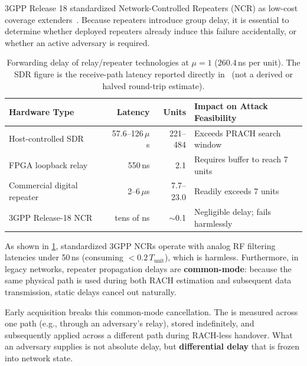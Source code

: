 3GPP Release 18 standardized Network-Controlled Repeaters (NCR) as low-cost coverage
extenders~\cite{3gpp38867,carvalho2024ncr}.
Because repeaters introduce group delay, it is essential to determine whether deployed repeaters already
induce this failure accidentally, or whether an active adversary is required.

\begin{table}[htbp]
  \centering
  \caption{Forwarding delay of relay/repeater technologies at $\mu=1$ ($260.4$\,ns per \TA{} unit). The
  SDR figure is the receive-path latency reported directly in~\cite{usrplatency} (not a derived or
  halved round-trip estimate).}
  \label{tab:hardware}
  \small
  \begin{tabularx}{\textwidth}{@{}l r r X@{}}
    \toprule
    Hardware Type & Latency & \TA{} Units & Impact on Attack Feasibility \\
    \midrule
    Host-controlled SDR~\cite{usrplatency} & 57.6--126\,$\mu$s & 221--484 & Exceeds PRACH search window \\
    FPGA loopback relay~\cite{nifpgaloopback} & 550\,ns & 2.1 & Requires buffer to reach 7 units \\
    Commercial digital repeater~\cite{ti2018repeater} & 2--6\,$\mu$s & 7.7--23.0 & Readily exceeds 7 units \\
    3GPP Release-18 NCR~\cite{3gpp38867,carvalho2024ncr} & tens of ns & $\sim$0.1 & Negligible delay; fails harmlessly \\
    \bottomrule
  \end{tabularx}
\end{table}

As shown in \cref{tab:hardware}, standardized 3GPP NCRs operate with analog RF filtering latencies under
50\,ns (consuming $<0.2\,T_{\mathrm{unit}}$), which is harmless. Furthermore, in legacy networks, repeater
propagation delays are \textbf{common-mode}: because the same physical path is used during both RACH
estimation and subsequent data transmission, static delays cancel out naturally.

Early acquisition breaks this common-mode cancellation. The \TA{} is measured across one path (e.g.,
through an adversary's relay), stored indefinitely, and subsequently applied across a different path
during RACH-less handover. What an adversary supplies is not absolute delay, but \textbf{differential
delay} that is frozen into network state.

